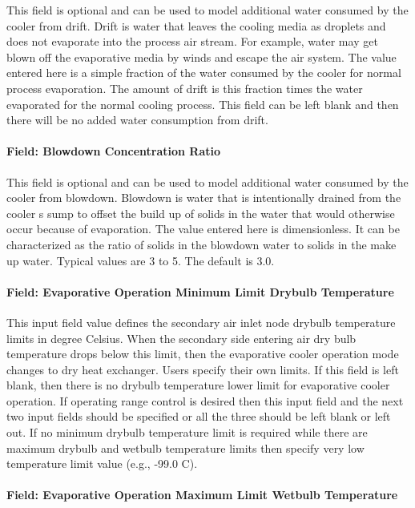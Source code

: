 This field is optional and can be used to model additional water consumed by the cooler from drift. Drift is water that leaves the cooling media as droplets and does not evaporate into the process air stream. For example, water may get blown off the evaporative media by winds and escape the air system. The value entered here is a simple fraction of the water consumed by the cooler for normal process evaporation. The amount of drift is this fraction times the water evaporated for the normal cooling process. This field can be left blank and then there will be no added water consumption from drift.

\paragraph{Field: Blowdown Concentration Ratio}\label{field-blowdown-concentration-ratio-2-000}

This field is optional and can be used to model additional water consumed by the cooler from blowdown. Blowdown is water that is intentionally drained from the cooler s sump to offset the build up of solids in the water that would otherwise occur because of evaporation. The value entered here is dimensionless. It can be characterized as the ratio of solids in the blowdown water to solids in the make up water. Typical values are 3 to 5. The default is 3.0.

\paragraph{Field: Evaporative Operation Minimum Limit Drybulb Temperature}\label{field-evaporative-operation-minimum-limit-drybulb-temperature}

This input field value defines the secondary air inlet node drybulb temperature limits in degree Celsius. When the secondary side entering air dry bulb temperature drops below this limit, then the evaporative cooler operation mode changes to dry heat exchanger. Users specify their own limits. If this field is left blank, then there is no drybulb temperature lower limit for evaporative cooler operation. If operating range control is desired then this input field and the next two input fields should be specified or all the three should be left blank or left out. If no minimum drybulb temperature limit is required while there are maximum drybulb and wetbulb temperature limits then specify very low temperature limit value (e.g., -99.0 C).

\paragraph{Field: Evaporative Operation Maximum Limit Wetbulb Temperature}\label{field-evaporative-operation-maximum-limit-wetbulb-temperature-1}

